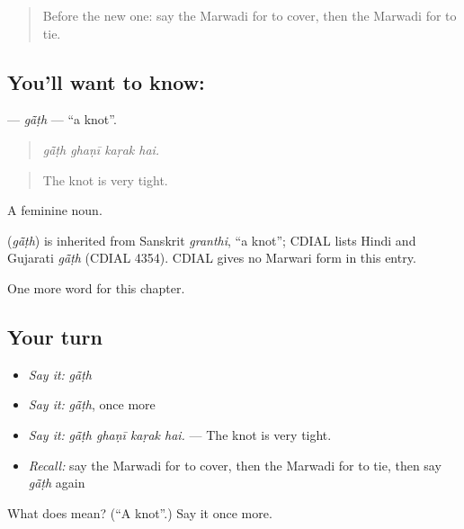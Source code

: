 \begin{quote}
Before the new one: say the Marwadi for to cover, then the Marwadi for to tie.
\end{quote}

\subsection*{You'll want to know: }
\textbf{} — \emph{gā̃ṭh} — \textquotedblleft{}a knot\textquotedblright{}.

\begin{quote}
   
\end{quote}

\begin{quote}
\emph{gā̃ṭh ghaṇī kaṛak hai.}
\end{quote}

\begin{quote}
The knot is very tight.
\end{quote}

A feminine noun.

\begin{cousinweb}
\textbf{} (\emph{gā̃ṭh}) is inherited from Sanskrit \emph{granthi}, \textquotedblleft{}a knot\textquotedblright{}; CDIAL lists Hindi and Gujarati \emph{gā̃ṭh} (CDIAL 4354). CDIAL gives no Marwari form in this entry.
\end{cousinweb}

\begin{grammarlens}[title={What you've built}]
One more word for this chapter.
\end{grammarlens}

\subsection*{Your turn}
\begin{itemize}
\raggedright
  \item \emph{Say it:} \emph{gā̃ṭh}
  \item \emph{Say it:} \emph{gā̃ṭh}, once more
  \item \emph{Say it:} \emph{gā̃ṭh ghaṇī kaṛak hai.} — The knot is very tight.
  \item \emph{Recall:} say the Marwadi for to cover, then the Marwadi for to tie, then say \emph{gā̃ṭh} again
\end{itemize}

\begin{tcolorbox}[breakable,colback=teal!4,colframe=teal!35!black,title={Before you move on}]
What does  mean? (\textquotedblleft{}A knot\textquotedblright{}.) Say it once more.
\end{tcolorbox}
